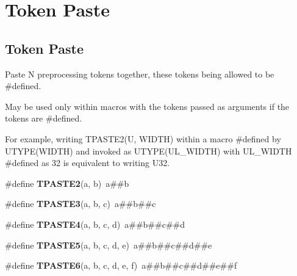 \hypertarget{group__group__xmega__utils__tpaste}{\section{Token Paste}
\label{group__group__xmega__utils__tpaste}
}
\subsection*{Token Paste}
\label{_amgrp95fd98b9acf33b4f1f1cfa86699bc1f2}%
 Paste N preprocessing tokens together, these tokens being allowed to be \#defined.

May be used only within macros with the tokens passed as arguments if the tokens are \#defined.

For example, writing T\-P\-A\-S\-T\-E2(\-U, W\-I\-D\-T\-H) within a macro \#defined by U\-T\-Y\-P\-E(\-W\-I\-D\-T\-H) and invoked as U\-T\-Y\-P\-E(\-U\-L\-\_\-\-W\-I\-D\-T\-H) with U\-L\-\_\-\-W\-I\-D\-T\-H \#defined as 32 is equivalent to writing U32. \begin{DoxyCompactItemize}
\item 
\hypertarget{group__group__xmega__utils__tpaste_ga55fb148844f5ba993a992b609728e82e}{\#define {\bfseries T\-P\-A\-S\-T\-E2}(a, b)~a\#\#b}\label{group__group__xmega__utils__tpaste_ga55fb148844f5ba993a992b609728e82e}

\item 
\hypertarget{group__group__xmega__utils__tpaste_ga3774e5e321825e6ab4a27fef2a0deb14}{\#define {\bfseries T\-P\-A\-S\-T\-E3}(a, b, c)~a\#\#b\#\#c}\label{group__group__xmega__utils__tpaste_ga3774e5e321825e6ab4a27fef2a0deb14}

\item 
\hypertarget{group__group__xmega__utils__tpaste_ga7df52ac8ee04480944ef404ef9418b38}{\#define {\bfseries T\-P\-A\-S\-T\-E4}(a, b, c, d)~a\#\#b\#\#c\#\#d}\label{group__group__xmega__utils__tpaste_ga7df52ac8ee04480944ef404ef9418b38}

\item 
\hypertarget{group__group__xmega__utils__tpaste_gac9624b958617cbb3281de7ec41f53230}{\#define {\bfseries T\-P\-A\-S\-T\-E5}(a, b, c, d, e)~a\#\#b\#\#c\#\#d\#\#e}\label{group__group__xmega__utils__tpaste_gac9624b958617cbb3281de7ec41f53230}

\item 
\hypertarget{group__group__xmega__utils__tpaste_ga2c4dbcf9049d7553366bbf9b9bc4e801}{\#define {\bfseries T\-P\-A\-S\-T\-E6}(a, b, c, d, e, f)~a\#\#b\#\#c\#\#d\#\#e\#\#f}\label{group__group__xmega__utils__tpaste_ga2c4dbcf9049d7553366bbf9b9bc4e801}


\end{DoxyCompactItemize}
